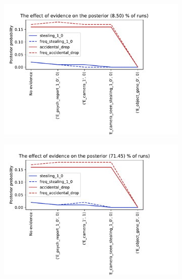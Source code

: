 \begin{enumerate}
\begin{figure}[htbp]
\begin{center}
\begin{subfigure}{.6\textwidth}
\includegraphics[width=\linewidth]{../experiments/GroteMarktPrivate/plots/evidence_progress_GroteMarktPrivate_4.pdf}
\caption{}
\label{default}
\end{subfigure}%
\begin{subfigure}{.6\textwidth}
\includegraphics[width=\linewidth]{../experiments/GroteMarktPrivate/plots/evidence_progress_GroteMarktPrivate_1.pdf}
\caption{}
\label{default}
\end{subfigure}
\begin{subfigure}{.6\textwidth}

\end{subfigure}
\end{center}
\end{figure}
\end{enumerate}

